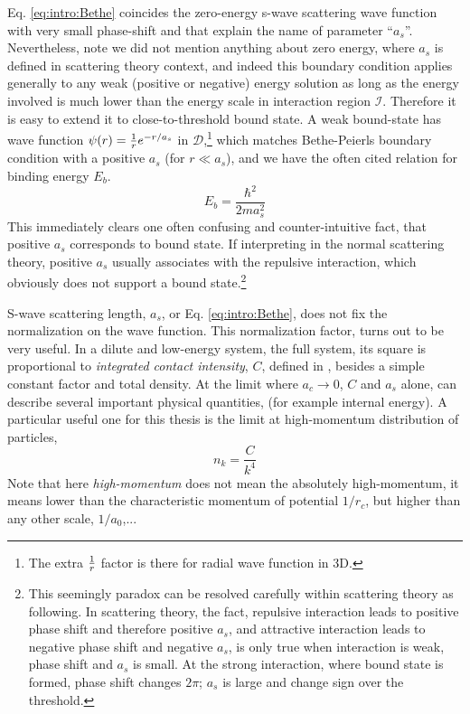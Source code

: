 Eq. \ref{eq:intro:Bethe} coincides the zero-energy s-wave scattering wave function with very small phase-shift and that explain the name of parameter ``$a_s$''. Nevertheless,   note we did not mention anything about zero energy, where $a_{s}$ is defined in scattering theory context, and indeed this boundary condition applies generally to  any weak (positive or negative) energy solution as long as the energy involved is much lower than the energy scale in interaction region $\mathcal{I}$.  Therefore it is easy to extend it to close-to-threshold bound state.  A weak bound-state has wave function $\psi(r)=\frac{1}{r}e^{-r/a_s}$ in $\mathcal{D}$,\footnote{The extra $\frac{1}{r}$ factor is there for  radial wave function in 3D.} which matches Bethe-Peierls boundary condition with a positive $a_{s}$ (for  $r\ll{}a_{s}$), and we have the often cited relation for binding energy $E_{b}$.
\begin{equation}
 E_{b}=\frac{\hbar^{2}}{2ma_{s}^{2}}
\end{equation}
  This immediately clears one often confusing and counter-intuitive fact, that positive  $a_s$ corresponds to bound state.  If interpreting in the normal scattering theory, positive $a_s$  usually associates with the repulsive interaction, which obviously does not support a bound state.\footnote{This seemingly paradox can be resolved carefully within scattering theory as following. In scattering theory, the fact,  repulsive interaction leads to positive phase shift and therefore positive $a_s$, and attractive interaction leads to negative phase shift and negative $a_s$, is only true when interaction is weak, phase shift and $a_s$ is small.  At the strong interaction, where bound state is formed, phase shift changes $2\pi$; $a_s$ is large and  change sign over the threshold. }

 S-wave scattering length, $a_s$, or Eq. \ref{eq:intro:Bethe}, does not fix the normalization on the wave function. This normalization factor, turns out to be very useful.  In a dilute and low-energy system, the full system, its square is proportional to  \emph{integrated contact intensity}, $C$, defined in \cite{ Tan2008-1,Tan2008-2,CombescotTan}, besides a simple constant factor and total density.  At the limit where $a_c\to0$, $C$ and $a_s$ alone, can describe several important physical quantities, (for example internal energy).  A particular useful one for this thesis is the limit at high-momentum distribution of particles, 
 \begin{equation}
 n_k=\frac{C}{k^4}
 \end{equation}
 Note that here \emph{high-momentum} does not mean the absolutely high-momentum, it means lower than the characteristic momentum of potential $1/r_c$, but higher than any other scale, $1/a_0$,...  
 

